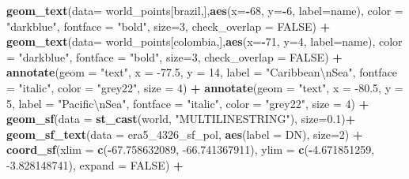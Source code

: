\documentclass[12pt,oneside]{reedthesis}
\newenvironment{Shaded}{\begin{snugshade}}{\end{snugshade}}
\newcommand{\CharTok}[1]{\textcolor[rgb]{0.31,0.60,0.02}{#1}}
\newcommand{\DataTypeTok}[1]{\textcolor[rgb]{0.13,0.29,0.53}{#1}}
\newcommand{\DecValTok}[1]{\textcolor[rgb]{0.00,0.00,0.81}{#1}}
\newcommand{\FloatTok}[1]{\textcolor[rgb]{0.00,0.00,0.81}{#1}}
\newcommand{\KeywordTok}[1]{\textcolor[rgb]{0.13,0.29,0.53}{\textbf{#1}}}
\newcommand{\NormalTok}[1]{#1}
\newcommand{\OperatorTok}[1]{\textcolor[rgb]{0.81,0.36,0.00}{\textbf{#1}}}
\newcommand{\OtherTok}[1]{\textcolor[rgb]{0.56,0.35,0.01}{#1}}
\newcommand{\StringTok}[1]{\textcolor[rgb]{0.31,0.60,0.02}{#1}}
\begin{document}
\begin{Shaded}
\begin{Highlighting}[]
\StringTok{  }\KeywordTok{geom_text}\NormalTok{(}\DataTypeTok{data=}\NormalTok{ world_points[brazil,],}\KeywordTok{aes}\NormalTok{(}\DataTypeTok{x=}\OperatorTok{-}\DecValTok{68}\NormalTok{, }\DataTypeTok{y=}\OperatorTok{-}\DecValTok{6}\NormalTok{, }\DataTypeTok{label=}\NormalTok{name), }\DataTypeTok{color =} \StringTok{"darkblue"}\NormalTok{, }\DataTypeTok{fontface =} \StringTok{"bold"}\NormalTok{, }\DataTypeTok{size=}\DecValTok{3}\NormalTok{, }\DataTypeTok{check_overlap =} \OtherTok{FALSE}\NormalTok{) }\OperatorTok{+}
\StringTok{  }\KeywordTok{geom_text}\NormalTok{(}\DataTypeTok{data=}\NormalTok{ world_points[colombia,],}\KeywordTok{aes}\NormalTok{(}\DataTypeTok{x=}\OperatorTok{-}\DecValTok{71}\NormalTok{, }\DataTypeTok{y=}\DecValTok{4}\NormalTok{, }\DataTypeTok{label=}\NormalTok{name), }\DataTypeTok{color =} \StringTok{"darkblue"}\NormalTok{, }\DataTypeTok{fontface =} \StringTok{"bold"}\NormalTok{, }\DataTypeTok{size=}\DecValTok{3}\NormalTok{, }\DataTypeTok{check_overlap =} \OtherTok{FALSE}\NormalTok{) }\OperatorTok{+}
\StringTok{  }\KeywordTok{annotate}\NormalTok{(}\DataTypeTok{geom =} \StringTok{"text"}\NormalTok{, }\DataTypeTok{x =} \FloatTok{-77.5}\NormalTok{, }\DataTypeTok{y =} \DecValTok{14}\NormalTok{, }\DataTypeTok{label =} \StringTok{"Caribbean}\CharTok{\textbackslash{}n}\StringTok{Sea"}\NormalTok{, }\DataTypeTok{fontface =} \StringTok{"italic"}\NormalTok{, }\DataTypeTok{color =} \StringTok{"grey22"}\NormalTok{, }\DataTypeTok{size =} \DecValTok{4}\NormalTok{) }\OperatorTok{+}\StringTok{ }
\StringTok{  }\KeywordTok{annotate}\NormalTok{(}\DataTypeTok{geom =} \StringTok{"text"}\NormalTok{, }\DataTypeTok{x =} \FloatTok{-80.5}\NormalTok{, }\DataTypeTok{y =} \DecValTok{5}\NormalTok{, }\DataTypeTok{label =} \StringTok{"Pacific}\CharTok{\textbackslash{}n}\StringTok{Sea"}\NormalTok{, }\DataTypeTok{fontface =} \StringTok{"italic"}\NormalTok{, }\DataTypeTok{color =} \StringTok{"grey22"}\NormalTok{, }\DataTypeTok{size =} \DecValTok{4}\NormalTok{) }\OperatorTok{+}
\StringTok{  }\KeywordTok{geom_sf}\NormalTok{(}\DataTypeTok{data =} \KeywordTok{st_cast}\NormalTok{(world, }\StringTok{"MULTILINESTRING"}\NormalTok{),  }\DataTypeTok{size=}\FloatTok{0.1}\NormalTok{)}\OperatorTok{+}
\StringTok{  }\KeywordTok{geom_sf_text}\NormalTok{(}\DataTypeTok{data =}\NormalTok{ era5_}\DecValTok{4326}\NormalTok{_sf_pol, }\KeywordTok{aes}\NormalTok{(}\DataTypeTok{label =}\NormalTok{ DN), }\DataTypeTok{size=}\DecValTok{2}\NormalTok{) }\OperatorTok{+}
\StringTok{  }\KeywordTok{coord_sf}\NormalTok{(}\DataTypeTok{xlim =} \KeywordTok{c}\NormalTok{(}\OperatorTok{-}\FloatTok{67.758632089}\NormalTok{, }\FloatTok{-66.741367911}\NormalTok{), }\DataTypeTok{ylim =} \KeywordTok{c}\NormalTok{(}\OperatorTok{-}\FloatTok{4.671851259}\NormalTok{, }\FloatTok{-3.828148741}\NormalTok{), }\DataTypeTok{expand =} \OtherTok{FALSE}\NormalTok{) }\OperatorTok{+}

\end{Highlighting}
\end{Shaded}
\end{document}
